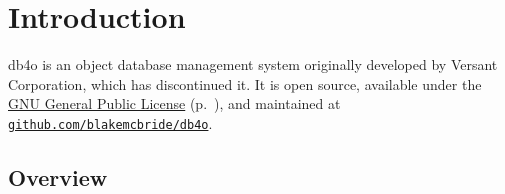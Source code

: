 
\chapter{Introduction}
\label{ref:welcome}

db4o is an object database management system originally developed by Versant Corporation, which has discontinued it. It is open source, available under the \hyperref[ref:license]{GNU General Public License} (p.~\pageref{ref:license}), and maintained at \href{https://github.com/blakemcbride/db4o}{\nolinkurl{github.com/blakemcbride/db4o}}.

\section*{Overview}

